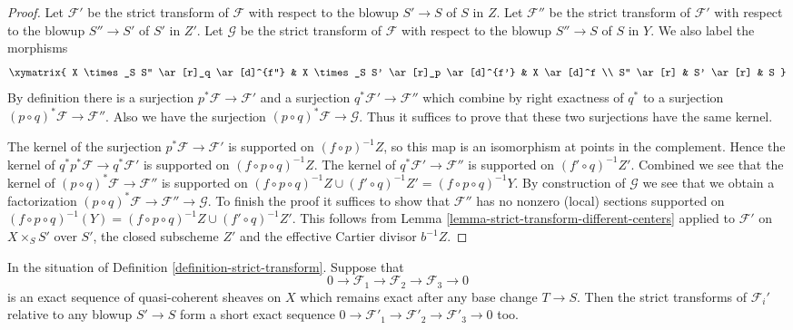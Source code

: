 \begin{proof}
Let $\mathcal{F}'$ be the strict transform of $\mathcal{F}$ with respect
to the blowup $S' \to S$ of $S$ in $Z$.
Let $\mathcal{F}''$ be the strict transform of $\mathcal{F}'$ with respect
to the blowup $S'' \to S'$ of $S'$ in $Z'$.
Let $\mathcal{G}$ be the strict transform of $\mathcal{F}$ with respect
to the blowup $S'' \to S$ of $S$ in $Y$.
We also label the morphisms
$$
\xymatrix{
X \times_S S'' \ar[r]_q \ar[d]^{f''} &
X \times_S S' \ar[r]_p \ar[d]^{f'} &
X \ar[d]^f \\
S'' \ar[r] & S' \ar[r] & S
}
$$
By definition there is a surjection $p^*\mathcal{F} \to \mathcal{F}'$
and a surjection $q^*\mathcal{F}' \to \mathcal{F}''$ which combine
by right exactness of $q^*$ to a surjection
$(p \circ q)^*\mathcal{F} \to \mathcal{F}''$. Also we have the surjection
$(p \circ q)^*\mathcal{F} \to \mathcal{G}$. Thus it suffices to prove
that these two surjections have the same kernel.

\medskip\noindent
The kernel of the surjection $p^*\mathcal{F} \to \mathcal{F}'$
is supported on $(f \circ p)^{-1}Z$, so this map is an isomorphism at
points in the complement. Hence the kernel of
$q^*p^*\mathcal{F} \to q^*\mathcal{F}'$
is supported on $(f \circ p \circ q)^{-1}Z$. The kernel of
$q^*\mathcal{F}' \to \mathcal{F}''$ is supported on $(f' \circ q)^{-1}Z'$.
Combined we see that the kernel of
$(p \circ q)^*\mathcal{F} \to \mathcal{F}''$ is supported on
$(f \circ p \circ q)^{-1}Z \cup (f' \circ q)^{-1}Z' =
(f \circ p \circ q)^{-1}Y$.
By construction of $\mathcal{G}$ we see that we obtain a factorization
$(p \circ q)^*\mathcal{F} \to \mathcal{F}'' \to \mathcal{G}$.
To finish the proof it suffices to show that $\mathcal{F}''$ has no
nonzero (local) sections supported on
$(f \circ p \circ q)^{-1}(Y) =
(f \circ p \circ q)^{-1}Z \cup (f' \circ q)^{-1}Z'$.
This follows from Lemma \ref{lemma-strict-transform-different-centers}
applied to $\mathcal{F}'$ on $X \times_S S'$ over $S'$, the closed
subscheme $Z'$ and the effective Cartier divisor $b^{-1}Z$.
\end{proof}

\begin{lemma}
\label{lemma-strict-transform-universally-injective}
In the situation of Definition \ref{definition-strict-transform}.
Suppose that
$$
0 \to \mathcal{F}_1 \to \mathcal{F}_2 \to \mathcal{F}_3 \to 0
$$
is an exact sequence of quasi-coherent sheaves on $X$ which remains
exact after any base change $T \to S$. Then the strict transforms of
$\mathcal{F}_i'$ relative to any blowup $S' \to S$
form a short exact sequence
$0 \to \mathcal{F}'_1 \to \mathcal{F}'_2 \to \mathcal{F}'_3 \to 0$ too.
\end{lemma}


